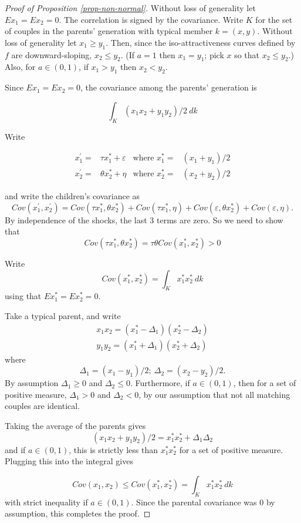 \documentclass[
  12pt,
]{article}
\theoremstyle{definition}
\theoremstyle{definition}
\theoremstyle{definition}
\theoremstyle{definition}
\theoremstyle{remark}
\begin{document}
\begin{proof}[Proof of Proposition \ref{prop-non-normal}]
Without loss of generality let $Ex_1 = Ex_2 = 0$. The correlation is signed by
the covariance. Write $K$ for the set of couples in the parents' generation with
typical member $k = (x,y)$. Without loss of generality let $x_1 \ge y_1$. Then,
since the iso-attractiveness curves defined by $f$ are downward-sloping, 
$x_2 \le y_2$. (If $a = 1$ then $x_1 = y_1$; pick $x$ so that $x_2 \le y_2$.) Also,
for $a \in (0,1)$, if $x_1 > y_1$ then $x_2 < y_2$.

Since $Ex_1 = Ex_2 = 0$, the covariance among the parents' generation is

\[
\int_K (x_1x_2 + y_1y_2)/2 \ dk
\]

Write

\begin{align*}
x^\prime_1 =& \tau x^*_1 + \varepsilon & \textrm{where } x^*_1 =& (x_1+y_1)/2  \\
x^\prime_2 =& \theta x^*_2 + \eta & \textrm{where } x^*_2 =& (x_2+y_2)/2  
\end{align*}

and write the children's covariance as
\[
Cov(x^\prime_1, x^\prime_2) = Cov(\tau x^*_1, \theta x^*_2) + Cov(\tau x^*_1, \eta) + 
  Cov(\varepsilon, \theta x^*_2) + Cov(\varepsilon, \eta).
\]
By independence of the shocks, the last 3 terms are zero. So we need to
show that
\[
Cov(\tau x^*_1, \theta x^*_2) = \tau\theta Cov(x^*_1, x^*_2) > 0
\]

Write
\[
Cov(x^*_1, x^*_2) = \int_K x^*_1 x^*_2 \ dk
\]
using that $Ex^*_1 = Ex^*_2 = 0$. 

Take a typical parent, and write
\begin{align*}
x_1x_2 = (x^*_1 - \Delta_1)(x^*_2 - \Delta_2) \\
y_1y_2 = (x^*_1 + \Delta_1)(x^*_2 + \Delta_2)
\end{align*}
where 
\[
\Delta_1 = (x_1 - y_1)/2;\ \Delta_2 = (x_2 - y_2)/2.
\]
By assumption $\Delta_1 \ge 0$ and $\Delta_2 \le 0$. Furthermore, if $a \in (0,1)$, then
for a set of positive measure, $\Delta_1 > 0$ and $\Delta_2 < 0$, by our assumption 
that not all matching couples are identical.

Taking the average of the parents gives
\[
(x_1x_2 + y_1y_2)/2 = x^*_1x^*_2 + \Delta_1\Delta_2
\]
and if $a \in (0,1)$, this is strictly less than $x^*_1x^*_2$ for a set of 
positive measure. Plugging this into the integral gives

\[
Cov(x_1,x_2) \le Cov(x^*_1, x^*_2) = \int_K x^*_1 x^*_2 \ dk
\]
with strict inequality if $a \in (0,1)$. Since the parental covariance was 0
by assumption, this completes the proof.

\end{proof}
\end{document}
